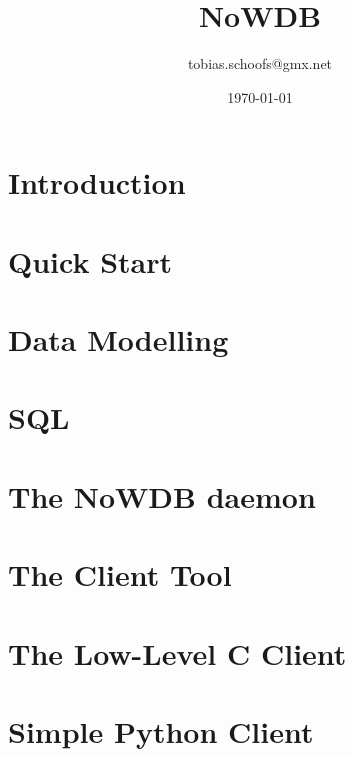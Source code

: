 \documentclass{scrreprt}
\begin{document}
\setlength{\parindent}{0pt}
\setlength{\parskip}{8pt}

\title {NoWDB}
\author {tobias.schoofs@gmx.net}
\date{\today}
\maketitle
\tableofcontents

\chapter{Introduction}\label{chpt_intro} 


\chapter{Quick Start}\label{chpt_quickst}


\chapter{Data Modelling}\label{chpt_model}

\chapter{SQL}\label{chpt_sql}


\chapter{The NoWDB daemon}\label{chpt_nowdbd}

\chapter{The Client Tool}\label{chpt_clienttool}

\chapter{The Low-Level C Client}\label{chpt_llc}


\chapter{Simple Python Client}\label{chpt_pythonclient}

\end{document}
